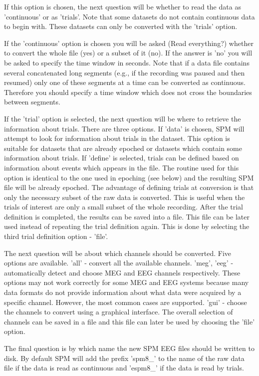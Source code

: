 If this option is chosen, the next question will be whether to read
the data as 'continuous' or as 'trials'. Note that some datasets do
not contain continuous data to begin with. These datasets can only be
converted with the 'trials' option.  

If the 'continuous' option is chosen you will be asked (Read
everything?) whether to convert the whole file (yes) or a subset of it
(no). If the answer is 'no' you will be asked to specify the time
window in seconds. Note that if a data file contains several
concatenated long segments (e.g., if the recording was paused
and then resumed) only one of these segments at a time can be
converted as continuous.  Therefore you should specify a time window
which does not cross the boundaries between segments.  

If the 'trial' option is selected, the next question will be where to
retrieve the information about trials. There are three options. If
'data' is chosen, SPM will attempt to look for information about
trials in the dataset. This option is suitable for datasets that are already epoched
or datasets which contain some information about trials. If 'define'
is selected, trials can be defined based on information about events
which appears in the file. The routine used for this option is
identical to the one used in epoching (see below) and the resulting
SPM file will be already epoched. The advantage of defining trials at
conversion is that only the necessary subset of the raw data is
converted. This is useful when the trials of interest are only a small
subset of the whole recording. After the trial definition is
completed, the results can be saved into a file. This file can be
later used instead of repeating the trial definition again. This is
done by selecting the third trial definition option - 'file'. 

The next question will be about which channels should be
converted. Five options are available. 'all' - convert 
all the available channels. 'meg', 'eeg' - automatically detect and
choose MEG and EEG channels respectively. These options may
not work correctly for some MEG and EEG systems because many
data formats do not provide information about what data were acquired
by a specific channel. However, the most common cases are supported.
'gui' - choose the channels to convert using a graphical interface. 
The overall selection of channels can be saved in a file and this
file can later be used by choosing the 'file' option.

The final question is by which name the new SPM EEG files should be
written to disk. By default SPM will add the prefix 'spm8\_' to the
name of the raw data file if the data is read as continuous and
'espm8\_' if the data is read by trials.  

